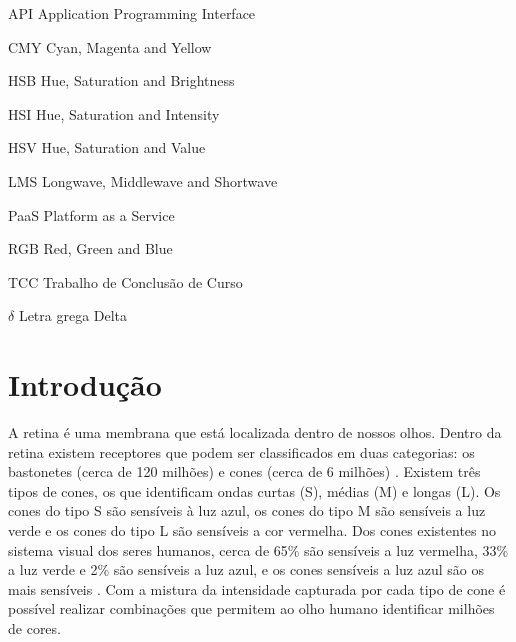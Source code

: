 \documentclass[	12pt, Times, openright, twoside, a4paper, english, brazil]{abntex2}
\begin{document}
\listoffigures*
\cleardoublepage

\listoftables*
\cleardoublepage


\begin{siglas}
  \item[API] Application Programming Interface
  \item[CMY] Cyan, Magenta and Yellow
  \item[HSB] Hue, Saturation and Brightness
  \item[HSI] Hue, Saturation and Intensity
  \item[HSV] Hue, Saturation and Value
  \item[LMS] Longwave, Middlewave and Shortwave
  \item[PaaS] Platform as a Service
  \item[RGB] Red, Green and Blue
  \item[TCC] Trabalho de Conclusão de Curso
  

\end{siglas}

\begin{simbolos}
  \item[$ \delta $] Letra grega Delta
\end{simbolos}

\tableofcontents*
\cleardoublepage

\textual

\chapter{Introdução}

A retina é uma membrana que está localizada dentro de nossos olhos. Dentro da retina existem receptores que podem ser classificados em duas categorias: os bastonetes (cerca de 120 milhões) e cones (cerca de 6 milhões) \cite{koschan2008}. Existem três tipos de cones, os que identificam ondas curtas (S), médias (M) e longas (L). Os cones do tipo S são sensíveis à luz azul, os cones do tipo M são sensíveis a luz verde e os cones do tipo L são sensíveis a cor vermelha. Dos cones existentes no sistema visual dos seres humanos, cerca de 65\% são sensíveis a luz vermelha, 33\% a luz verde e 2\% são sensíveis a luz azul, e os cones sensíveis a luz azul são os mais sensíveis \cite{gonzalez2008}. Com a mistura da intensidade capturada por cada tipo de cone é possível realizar combinações que permitem ao olho humano identificar milhões de cores.
\end{document}
